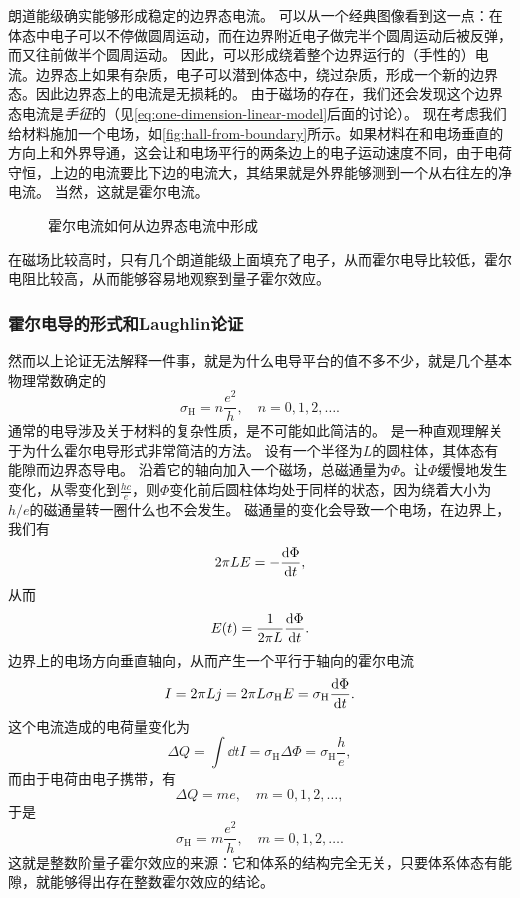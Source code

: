 朗道能级确实能够形成稳定的边界态电流。
可以从一个经典图像看到这一点：在体态中电子可以不停做圆周运动，而在边界附近电子做完半个圆周运动后被反弹，而又往前做半个圆周运动。
因此，可以形成绕着整个边界运行的（手性的）电流。边界态上如果有杂质，电子可以潜到体态中，绕过杂质，形成一个新的边界态。因此边界态上的电流是无损耗的。
由于磁场的存在，我们还会发现这个边界态电流是\emph{手征}的（见\eqref{eq:one-dimension-linear-model}后面的讨论）。
现在考虑我们给材料施加一个电场，如\autoref{fig:hall-from-boundary}所示。如果材料在和电场垂直的方向上和外界导通，这会让和电场平行的两条边上的电子运动速度不同，由于电荷守恒，上边的电流要比下边的电流大，其结果就是外界能够测到一个从右往左的净电流。
当然，这就是霍尔电流。

\begin{figure}
    \centering
    
    \caption{霍尔电流如何从边界态电流中形成}
    \label{fig:hall-from-boundary}
\end{figure}

在磁场比较高时，只有几个朗道能级上面填充了电子，从而霍尔电导比较低，霍尔电阻比较高，从而能够容易地观察到量子霍尔效应。

\subsubsection{霍尔电导的形式和Laughlin论证}

然而以上论证无法解释一件事，就是为什么电导平台的值不多不少，就是几个基本物理常数确定的
\[
    \sigma_\text{H} = n \frac{e^2}{h}, \quad n = 0, 1, 2, \ldots.
\]
通常的电导涉及关于材料的复杂性质，是不可能如此简洁的。
是一种直观理解关于为什么霍尔电导形式非常简洁的方法。
设有一个半径为$L$的圆柱体，其体态有能隙而边界态导电。
沿着它的轴向加入一个磁场，总磁通量为$\Phi$。让$\Phi$缓慢地发生变化，从零变化到$\frac{h c}{e}$，则$\Phi$变化前后圆柱体均处于同样的状态，因为绕着大小为$h / e$的磁通量转一圈什么也不会发生。
磁通量的变化会导致一个电场，在边界上，我们有
\[
    2 \pi L E = - \dv{\Phi}{t},
\]
从而
\[
    E(t) = \frac{1}{2\pi L} \dv{\Phi}{t}.
\]
边界上的电场方向垂直轴向，从而产生一个平行于轴向的霍尔电流
\[
    I = 2 \pi L j = 2 \pi L \sigma_\text{H} E = {\sigma_\text{H}} \dv{\Phi}{t}.
\]
这个电流造成的电荷量变化为
\[
    \Delta Q = \int \dd{t} I = {\sigma_\text{H}} \Delta \Phi = \sigma_\text{H} \frac{h}{e},
\]
而由于电荷由电子携带，有
\[
    \Delta Q = me, \quad m = 0, 1, 2, \ldots,
\]
于是
\[
    \sigma_\text{H} = m \frac{e^2}{h}, \quad m = 0, 1, 2, \ldots.
\]
这就是整数阶量子霍尔效应的来源：它和体系的结构完全无关，只要体系体态有能隙，就能够得出存在整数霍尔效应的结论。


